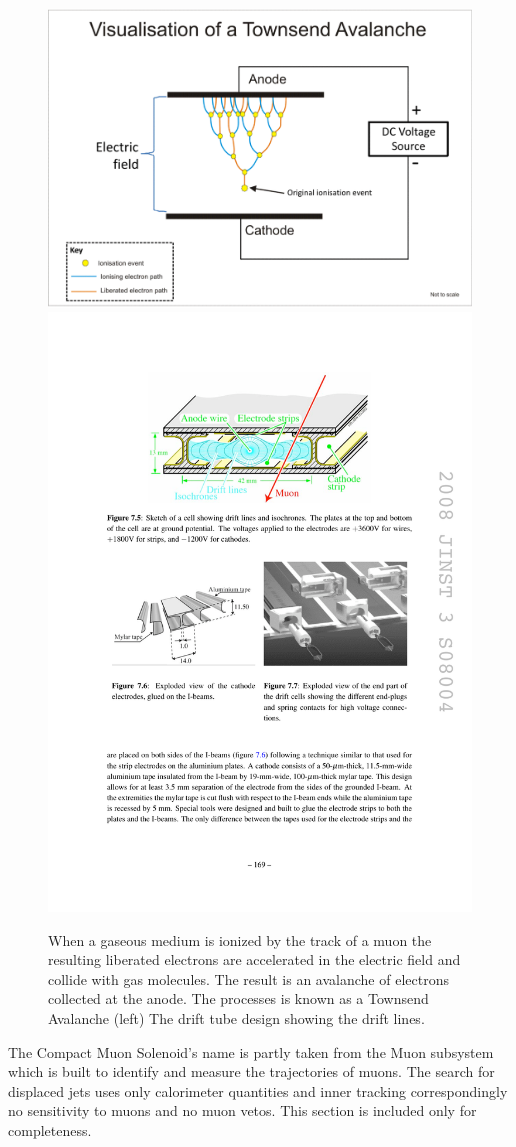 {\begin{figure}
\begin{center}
\includegraphics[width=.45\textwidth]{pics/avalanche}
\includegraphics[width=.45\textwidth]{pics/cell_diagram}
\end{center}
\caption{When a gaseous medium is ionized by the track of a muon the resulting liberated electrons are accelerated
in the electric field and collide with gas molecules. The result is an avalanche of electrons collected at the anode. 
The processes is known as a Townsend Avalanche (left) The drift tube design showing the drift lines.  }
\label{fig:avalance}
\end{figure}

The Compact Muon Solenoid's name is partly taken from the Muon subsystem which is
 built to identify and measure the trajectories of muons. The search for displaced jets uses only calorimeter
quantities and inner tracking correspondingly no sensitivity to muons and no muon vetos.
 This section is included only for completeness.  

}
